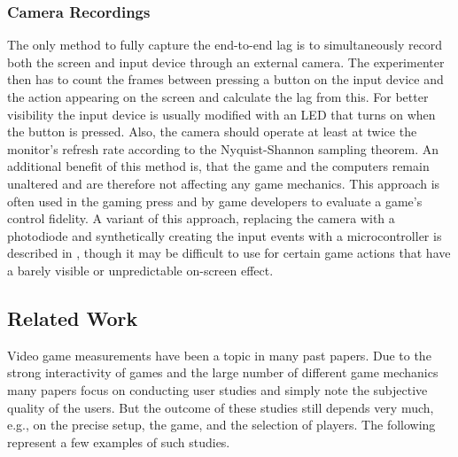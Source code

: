 \subsubsection{Camera Recordings}

The only method to fully capture the end-to-end lag is to simultaneously record both the screen and input device through an external camera. The experimenter then has to count the frames between pressing a button on the input device and the action appearing on the screen and calculate the lag from this. For better visibility the input device is usually modified with an LED that turns on when the button is pressed. Also, the camera should operate at least at twice the monitor's refresh rate according to the Nyquist-Shannon sampling theorem. An additional benefit of this method is, that the game and the computers remain unaltered and are therefore not affecting any game mechanics. This approach is often used in the gaming press and by game developers to evaluate a game's control fidelity. A variant of this approach, replacing the camera with a photodiode and synthetically creating the input events with a microcontroller is described in \cite{beyermethod}, though it may be difficult to use for certain game actions that have a barely visible or unpredictable on-screen effect.



\subsection{Related Work}
\label{sec:relatedwork}

Video game measurements have been a topic in many past papers. Due to the strong interactivity of games and the large number of different game mechanics many papers focus on conducting user studies and simply note the subjective quality of the users. But the outcome of these studies still depends very much, e.g., on the precise setup, the game, and the selection of players. The following represent a few examples of such studies. 

